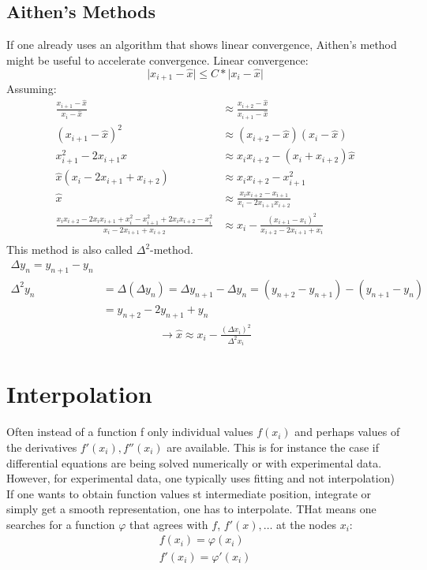\section{Aithen's Methods}\label{sec:aithen's-methods}
If one already uses an algorithm that shows linear convergence, Aithen's method might be useful to
accelerate convergence.
Linear convergence:
\begin{equation*}
    \lvert x_{i+1} - \hat{x} \rvert \leq C * \lvert x_i - \hat{x} \rvert
\end{equation*}
Assuming:
\begin{align*}
    \frac{ x_{i+1}-\hat{x} }{x_i - \hat{x}} &\approx
    \frac{ x_{i+2}-\hat{x}}{x_{i+1}-\hat{x}}\\
    (x_{i+1}-\hat{x})^2 &\approx (x_{i+2}-\hat{x})(x_i-\hat{x})\\
    x_{i+1}^2-2x_{i+1}\hat{x} &\approx x_i x_{i+2}-(x_i+x_{i+2})\hat{x}\\
    \hat{x}(x_i-2x_{i+1}+x_{i+2}) &\approx x_i x_{i+2}- x_{i+1}^2\\
    \hat{x} &\approx \frac{x_i x_{i+2}-x_{i+1}}{x_i-2x_{i+1} x_{i+2}}\\
    \frac{x_i x_{i+2}-2x_i x_{i+1}+x_i^2-x_{i+1}^2+2x_i x_{i+2}-x_i^2}{x_i-2x_{i+1}+x_{i+2}}&\approx x_i-\frac{(x_{i+1}-x_i)^2}{x_{i+2}-2x_{i+1}+x_i}\\
\end{align*}
This method is also called $\Delta^2$-method.
\begin{align*}
    \Delta y_n = y_{n+1}-y_n\\
    \Delta^2 y_n &= \Delta(\Delta y_n) = \Delta y_{n+1}-\Delta y_n = (y_{n+2}-y_{n+1})-(y_{n+1}-y_n)\\
    &=y_{n+2} -2y_{n+1}+y_n
\end{align*}
\begin{align*}
    \to \hat{x}\approx x_i - \frac{(\Delta x_i)^2}{\Delta^2 x_i}
\end{align*}


\chapter{Interpolation}\label{ch:interpolation}
Often instead of a function f only individual values $f(x_i)$ and
perhaps values of the derivatives $f'(x_i), f''(x_i)$ are available.
This is for instance the case if differential equations are being solved
numerically or with experimental data.
However, for experimental data, one typically uses fitting and not interpolation)
If one wants to obtain function values st intermediate position, integrate or
simply get a smooth representation, one has to interpolate.
THat means one searches for a function $\varphi$ that agrees with $f$, $f'(x), \ldots$
at the nodes $x_i$:
\begin{align*}
    f(x_i)=\varphi(x_i)\\
    f'(x_i)=\varphi'(x_i)
\end{align*}



